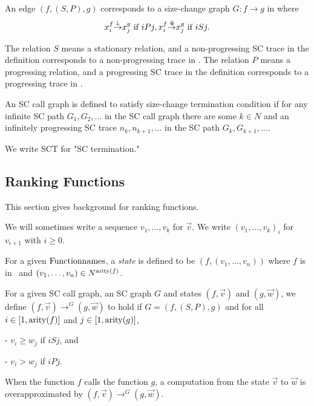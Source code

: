 An edge $(f, (S, P), g)$ corresponds to
a size-change graph $G : f \to g$ in \cite{Ikebuchi25}
where
\[
x_i^f {\displaystyle \mathop{\to}^\downarrow} x_j^g \hbox{ if } iPj, \\
x_i^f {\displaystyle \mathop{\to}^{=\hskip -5pt\downarrow}} x_j^g \hbox{ if } iSj.
\]

The relation $S$ means a stationary relation, and
a non-progressing SC trace in the definition
corresponds to a non-progressing trace in \cite{Brotherston11}.
The relation $P$ means a progressing relation, and
a progressing SC trace in the definition
corresponds to a progressing trace in \cite{Brotherston11}.

\begin{Def}\rm
An SC call graph is defined to satisfy size-change termination condition if
for any infinite SC path $G_1,G_2,\ldots$ in the SC call graph
there are some $k \in N$ and an infinitely progressing SC trace $n_k,n_{k+1},\ldots$
in the SC path $G_k,G_{k+1},\ldots$.
\end{Def}

We write SCT for "SC termination."

\subsection{Ranking Functions}

This section gives background for ranking functions.

We will sometimes write a sequence $v_1,\ldots,v_k$ for $\Vec v$.
We write $(v_1,\ldots,v_k)_i$ for $v_{i+1}$ with $i \ge 0$.

\begin{Def}[State]\rm
For a given ${\rm Functionnames}$,
a {\em state} is defined to be $(f,(v_1,\ldots,v_n))$
where $f$ is in \Functionnames\
and $(v_1,\ldots,v_n) \in N^{{\rm arity}(f)}$.

For a given SC call graph,
an SC graph $G$ and
states $(f, \Vec v)$ and $(g, \Vec w)$,
we define $(f, \Vec v) \to^G (g, \Vec w)$ to hold if
$G=(f,(S,P),g)$ and
for all $i \in [1,{\rm arity}(f)]$ and $j \in [1,{\rm arity}(g)]$,

- $v_i \ge w_j$ if $i S j$, and

- $v_i > w_j$ if $i P j$.
\end{Def}

When the function $f$ calls the function $g$,
a computation from the state $\Vec v$ to $\Vec w$ is overapproximated by
$(f, \Vec v) \to^G (g, \Vec w)$.

